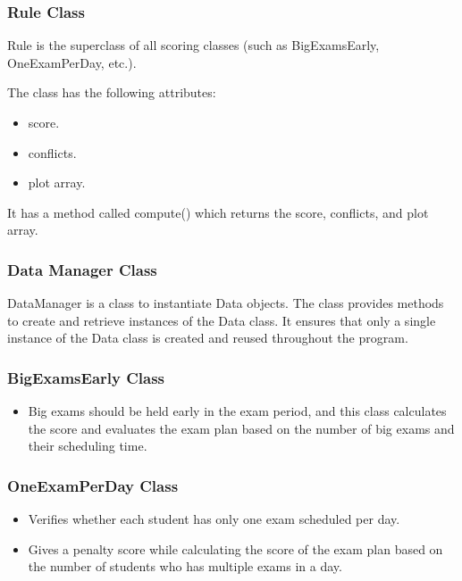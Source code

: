 \subsubsection{Rule Class}

Rule is the superclass of all scoring classes (such as BigExamsEarly, OneExamPerDay, etc.).

\vspace{\baselineskip}

The class has the following attributes:

\begin{itemize}
\item score.
\item conflicts.
\item plot array.
\end{itemize}
 
It has a method called compute() which returns the score, conflicts, and plot array.

\subsubsection{Data Manager Class}

DataManager is a class to instantiate Data objects. The class provides methods to create and retrieve instances of the Data class. It ensures that only a single instance of the Data class is created and reused throughout the program.

\vspace{\baselineskip}

\subsubsection{BigExamsEarly Class}


\begin{itemize}
\item Big exams should be held early in the exam period, and this class calculates the score and evaluates the exam plan based on the number of big exams and their scheduling time.
\end{itemize}


\subsubsection{OneExamPerDay Class}


\begin{itemize}
\item Verifies whether each student has only one exam scheduled per day.
\item Gives a penalty score while calculating the score of the exam plan based on the number of students who has multiple exams in a day.
\end{itemize}


